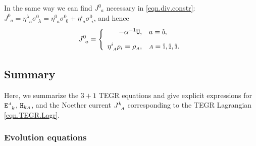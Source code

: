 \documentclass[
10pt, %
a4paper, %
oneside, %
headinclude,footinclude, %
BCOR5mm, %
]{scrartcl}
\newcommand{\sA}{\mathsmaller A}
\newcommand{\itetrsymbol}{\eta}
\newcommand{\itetr}[2]{\itetrsymbol^{#1}_{\phantom{#1}#2}}
\newcommand{\Hfin}[2]{\mathtt{H}_{#2#1}}	%
\newcommand{\Efin}[2]{\mathtt{E}^{#1}_{\phantom{#1}#2}}	%
\newcommand{\Ufin}{\mathtt{U}}
\newcommand{\EMmat}[2]{\sigma^{#1}_{\ \,#2}}
\newcommand{\NC}[2]{J^{#2}_{\phantom{#2}#1}}
\newcommand{\indalg}[1]{\hat{\mathsmaller{#1}}}
\begin{document}
In the same way we can find $ \NC{a}{0} $ necessary in \eqref{eqn.div.constr}: $ \NC{a}{0} = 
\itetr{\lambda}{a} \EMmat{0}{\lambda} = \itetr{0}{a} \EMmat{0}{0} + \itetr{i}{a} \EMmat{0}{i}$, and 
hence
\begin{equation}\label{eqn.Ja0}
	\NC{a}{0} = \left\{
	\begin{array}{rl}
		-\alpha^{-1} \Ufin,	& a=\indalg{0},  \\[3mm] 
		\itetr{i}{\sA} \rho_i = \rho_{\sA}, & \sA=\indalg{1},\indalg{2},\indalg{3}. \\ 
	\end{array} 
	\right.
\end{equation}




\subsection{Summary}
Here, we summarize the $ 3+1 $ TEGR equations and give explicit expressions for $ \Efin{\sA}{k} $, 
$ \Hfin{\sA}{k} $, and the Noether current $ \NC{\sA}{k} $ corresponding to the TEGR Lagrangian 
\eqref{eqn.TEGR.Lagr}.


\subsubsection{Evolution equations}
\end{document}
